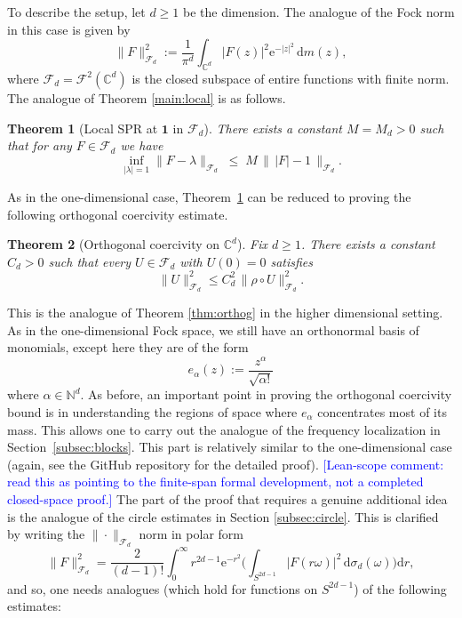 \documentclass[11pt]{amsart}
\newtheorem{theorem}{Theorem}[section]
\theoremstyle{remark}
\newcommand{\C}{\mathbb{C}}
\newcommand{\abs}[1]{\lvert #1 \rvert}
\newcommand{\norm}[1]{\lVert #1 \rVert}
\newcommand{\dd}{\mathrm{d}}
\newcommand{\ee}{\mathrm{e}}
\newcommand{\rhoFn}{\rho}
\newcommand{\Fd}{\mathcal{F}_d}
\newcommand{\Sphere}{S^{2d-1}}
\begin{document}
To describe the setup, let $d\geq 1$ be the dimension. The analogue of the Fock norm in this case is given by
\[
\norm{F}_{\Fd}^2
:=
\frac{1}{\pi^d}\int_{\C^d} \abs{F(z)}^2 \ee^{-\abs{z}^2}\,\dd m(z),
\]
where $\Fd = \mathcal{F}^2(\C^d)$ is the closed subspace of entire functions with
finite norm. The analogue of Theorem \ref{main:local} is as follows.
\begin{theorem}[Local SPR at $\mathbf{1}$ in $\mathcal{F}_d$]\label{mainhigherd:local}
There exists a constant $M=M_d> 0$ such
that for any $F\in \mathcal{F}_d$ we have
\[
\inf_{|\lambda|=1}\lVert F - \lambda \rVert_{\mathcal{F}_d}
\;\le\;
M\,
\bigl\|\, \lvert F \rvert - 1 \,\bigr\|_{\mathcal{F}_d}.
\]
\end{theorem}
As in the one-dimensional case, Theorem~\ref{mainhigherd:local} can be reduced to proving the following orthogonal coercivity estimate.
\begin{theorem}[Orthogonal coercivity on $\C^d$]\label{thm:orthogd}
Fix $d \ge 1$.  There exists a constant $C_d > 0$ such that every
$U \in \Fd$ with $U(0) = 0$ satisfies
\[
\norm{U}_{\Fd}^2
\le
C_d^2\, \norm{\rhoFn \circ U}_{\Fd}^2.
\]
\end{theorem}
This is the analogue of Theorem \ref{thm:orthog} in the higher dimensional setting. As in the one-dimensional Fock space, we still have an orthonormal basis of monomials, except here they are of the form
\[
e_\alpha(z) := \frac{z^\alpha}{\sqrt{\alpha!}}
\]
where $\alpha\in\mathbb{N}^d$. As before, an important point in proving the orthogonal coercivity bound is in understanding the regions of space where $e_{\alpha}$ concentrates most of its mass. This allows one to carry out the analogue of the frequency localization in Section~\ref{subsec:blocks}. This part is relatively similar to the one-dimensional case (again, see the GitHub repository for the detailed proof). \textcolor{blue}{[Lean-scope comment: read this as pointing to the finite-span formal development, not a completed closed-space proof.] } The part of the proof that requires a genuine additional idea is the analogue of the circle estimates in Section \ref{subsec:circle}. This is clarified by writing the $\|\cdot\|_{\mathcal{F}_d}$ norm in polar form
\begin{equation*}\label{eq:polard}
\norm{F}_{\Fd}^2
=
\frac{2}{(d-1)!}
\int_0^\infty
r^{2d-1} \ee^{-r^2}
\biggl(
\int_{\Sphere} \abs{F(r\omega)}^2\,\dd \sigma_d(\omega)
\biggr)\dd r,
\end{equation*}
and so, one needs analogues (which hold for functions on $S^{2d-1}$) of the following estimates:
\end{document}
